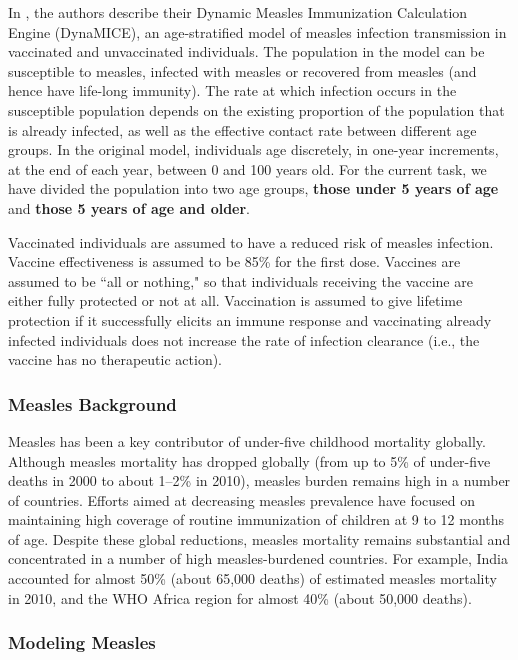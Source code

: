 \documentclass[letter,12pt, usenames,dvipsnames]{article}
\begin{document}
In \cite{measles}, the authors describe their Dynamic Measles Immunization Calculation Engine (DynaMICE), an age-stratified model of measles infection transmission in vaccinated and unvaccinated individuals. The population in the model can be susceptible to measles, infected with measles or recovered from measles (and hence have life-long immunity). The rate at which infection occurs in the susceptible population depends on the existing proportion of the population that is already infected, as well as the effective contact rate between different age groups. In the original model, individuals age discretely, in one-year increments, at the end of each year, between 0 and 100 years old. For the current task, we have divided the population into two age groups, {\bf those under 5 years of age} and {\bf those 5 years of age and older}.

Vaccinated individuals are assumed to have a reduced risk of measles infection. Vaccine effectiveness is assumed to be 85\% for the first dose. Vaccines are assumed to be ``all or nothing," so that individuals receiving the vaccine are either fully protected or not at all. Vaccination is assumed to give lifetime protection if it successfully elicits an immune response and vaccinating already infected individuals does not increase the rate of infection clearance (i.e., the vaccine has no therapeutic action).


\subsubsection{Measles Background}
Measles has been a key contributor of under-five childhood mortality globally. Although measles mortality has dropped globally (from up to 5\% of under-five deaths in 2000 to about 1–2\% in 2010), measles burden remains high in a number of countries. Efforts aimed at decreasing measles prevalence have focused on maintaining high coverage of routine immunization of children at 9 to 12 months of age.
Despite these global reductions, measles mortality remains substantial and concentrated in a number of high measles-burdened countries.  For example, India accounted for almost 50\% (about 65,000 deaths) of estimated measles mortality in 2010, and the WHO Africa region for almost 40\% (about 50,000 deaths). 

\subsubsection{Modeling Measles}
\end{document}

